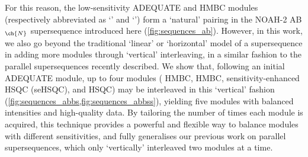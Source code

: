 \documentclass[a4paper,12pt]{article}
\newcommand{\carbon}{\ch{^{13}C}}
\newcommand{\nitrogen}{\ch{^{15}N}}
\newcommand{\abn}{NOAH-2 AB$_{\ch{N}}$}
\begin{document}
\begin{refsection}
For this reason, the low-sensitivity ADEQUATE and \nitrogen{} HMBC modules (respectively abbreviated as `' and `') form a `natural' pairing in the \abn{} supersequence introduced here (\cref{fig:sequences_ab}).
However, in this work, we also go beyond the traditional `linear' or `horizontal' model of a supersequence in adding more modules through `vertical' interleaving, in a similar fashion to the parallel supersequences recently described.\autocite{Kupce2021JACSA}
We show that, following an initial ADEQUATE module, up to four modules (\nitrogen{} HMBC, \carbon{} HMBC, \nitrogen{} sensitivity-enhanced HSQC (seHSQC), and \carbon{} HSQC) may be interleaved in this `vertical' fashion (\cref{fig:sequences_abbs,fig:sequences_abbss}), yielding five modules with balanced intensities and high-quality data.
By tailoring the number of times each module is acquired, this technique provides a powerful and flexible way to balance modules with different sensitivities, and fully generalises our previous work on parallel supersequences, which only `vertically' interleaved two modules at a time.


\end{refsection}
\end{document}
